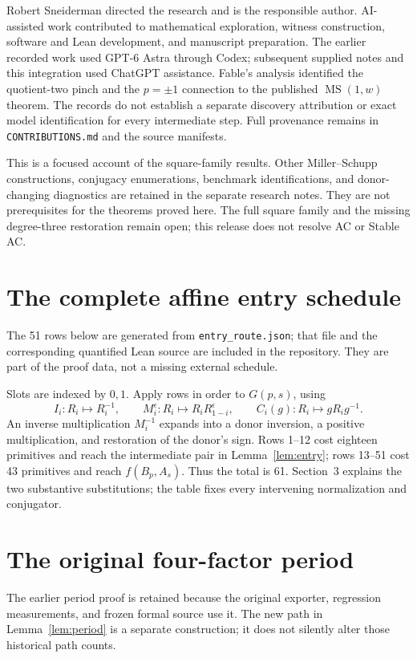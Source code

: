 \documentclass[11pt]{article}
\theoremstyle{definition}\newtheorem{definition}[theorem]{Definition}
\theoremstyle{remark}\newtheorem{remark}[theorem]{Remark}
\begin{document}
Robert Sneiderman directed the research and is the responsible author. AI-assisted work contributed to mathematical exploration, witness construction, software and Lean development, and manuscript preparation. The earlier recorded work used GPT-6 Astra through Codex; subsequent supplied notes and this integration used ChatGPT assistance. Fable's analysis identified the quotient-two pinch and the $p=\pm1$ connection to the published $\operatorname{MS}(1,w)$ theorem. The records do not establish a separate discovery attribution or exact model identification for every intermediate step. Full provenance remains in \texttt{CONTRIBUTIONS.md} and the source manifests.

This is a focused account of the square-family results. Other Miller--Schupp constructions, conjugacy enumerations, benchmark identifications, and donor-changing diagnostics are retained in the separate research notes. They are not prerequisites for the theorems proved here. The full square family and the missing degree-three restoration remain open; this release does not resolve AC or Stable AC.

\appendix
\section{The complete affine entry schedule}\label{app:entry}
The 51 rows below are generated from \texttt{entry\_route.json}; that file and the corresponding quantified Lean source are included in the repository. They are part of the proof data, not a missing external schedule.

Slots are indexed by $0,1$. Apply rows in order to $G(p,s)$, using
\[
I_i:R_i\mapsto R_i^{-1},\qquad
M_i^\epsilon:R_i\mapsto R_iR_{1-i}^\epsilon,\qquad
C_i(g):R_i\mapsto gR_ig^{-1}.
\]
An inverse multiplication $M_i^{-1}$ expands into a donor inversion, a positive multiplication, and restoration of the donor's sign. Rows 1--12 cost eighteen primitives and reach the intermediate pair in Lemma~\ref{lem:entry}; rows 13--51 cost 43 primitives and reach $f(B_p,A_s)$. Thus the total is 61. Section~3 explains the two substantive substitutions; the table fixes every intervening normalization and conjugator.



\section{The original four-factor period}\label{app:oldperiod}
The earlier period proof is retained because the original exporter, regression measurements, and frozen formal source use it. The new path in Lemma~\ref{lem:period} is a separate construction; it does not silently alter those historical path counts.
\end{document}
